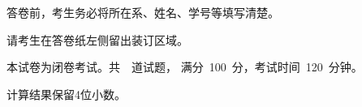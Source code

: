 \documentclass[12pt,letter]{ustcexam}
\begin{document}
\mifengxian

\MaketitleB   %
\Makedefen

\vspace{1em}
\begin{notice}
\item 答卷前，考生务必将所在系、姓名、学号等填写清楚。
\item 请考生在答卷纸左侧留出装订区域。
\item 本试卷为闭卷考试。共~\numquestions{}~道试题，
      满分~100~分，考试时间~120~分钟。
\item 计算结果保留4位小数。
\end{notice}
\end{document}
